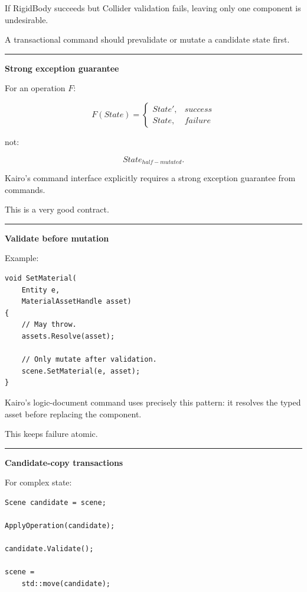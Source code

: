 If RigidBody succeeds but Collider validation fails, leaving only one component is undesirable.

A transactional command should prevalidate or mutate a candidate state first.

\begin{center}\rule{0.5\linewidth}{0.5pt}\end{center}

\textbf{Strong exception guarantee}

For an operation \(F\):

\[
F(State)=
\begin{cases}
State',&success\\
State,&failure
\end{cases}
\]

not:

\[
State_{half-mutated}.
\]

Kairo's command interface explicitly requires a strong exception guarantee from commands.

This is a very good contract.

\begin{center}\rule{0.5\linewidth}{0.5pt}\end{center}

\textbf{Validate before mutation}

Example:

\begin{verbatim}
void SetMaterial(
    Entity e,
    MaterialAssetHandle asset)
{
    // May throw.
    assets.Resolve(asset);

    // Only mutate after validation.
    scene.SetMaterial(e, asset);
}
\end{verbatim}

Kairo's logic-document command uses precisely this pattern: it resolves the typed asset before replacing the component.

This keeps failure atomic.

\begin{center}\rule{0.5\linewidth}{0.5pt}\end{center}

\textbf{Candidate-copy transactions}

For complex state:

\begin{verbatim}
Scene candidate = scene;

ApplyOperation(candidate);

candidate.Validate();

scene =
    std::move(candidate);
\end{verbatim}

